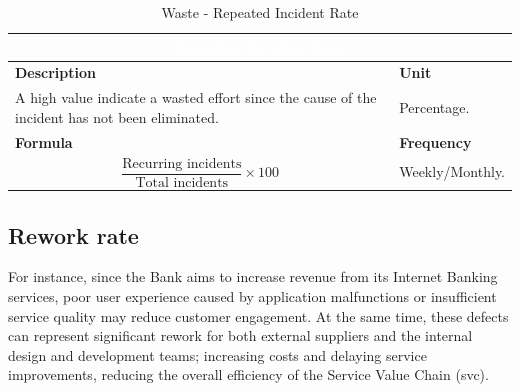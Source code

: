    \begin{table}[h]
        \centering
        \renewcommand{\arraystretch}{1.6}
        \setlength{\arrayrulewidth}{0.6pt}

        \begin{tabularx}{\textwidth}{|X|X|}
        \hline
        \multicolumn{2}{|c|}{\cellcolor{mcblue}\textcolor{white}{\textbf{Repeated Incident Rate}}} \\ \hline

        \rowcolor{mclightgray}
        \textbf{Description} & \textbf{Unit} \\ \hline
        A high value indicate a wasted effort since the cause of the incident has not been eliminated. &
        Percentage. \\ \hline

        \rowcolor{mclightgray}
        \textbf{Formula} & \textbf{Frequency} \\ \hline
        \[
            \frac{\text{Recurring incidents}}{\text{Total incidents}} \times 100
        \]

        &
        Weekly/Monthly. \\ \hline

        \end{tabularx}

        \caption{Waste - Repeated Incident Rate}
        \label{tab:measurement_RepeatedIncident}
    \end{table}


\subsection{Rework rate}
\label{sub:reworkRate}
    For instance, since the Bank aims to increase revenue from its Internet Banking services, poor user experience caused by application malfunctions or insufficient service quality may reduce customer engagement. At the same time, these defects can represent significant rework for both external suppliers and the internal design and development teams; increasing costs and delaying service improvements, reducing the overall efficiency of the Service Value Chain (\gls{svc}).

